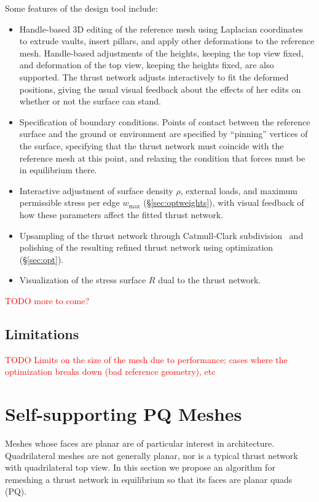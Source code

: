 \documentclass[annual]{acmsiggraph}
\newcommand{\todo}[1]{\textcolor{red}{#1}}
\newcommand{\secref}[1]{(\S\ref{#1})}
\begin{document}
Some features of the design tool include:
\begin{itemize}
\item Handle-based 3D editing of the reference mesh using Laplacian coordinates~\cite{Lipman2004,Sorkine2003} to extrude vaults, insert pillars, and apply other deformations to the reference mesh. Handle-based adjustments of the heights, keeping the top view fixed, and deformation of the top view, keeping the heights fixed, are also supported. The thrust network adjusts interactively to fit the deformed positions, giving the usual visual feedback about the effects of her edits on whether or not the surface can stand.
\item Specification of boundary conditions. Points of contact between the reference surface and the ground or environment are specified by ``pinning'' vertices of the surface, specifying that the thrust network must coincide with the reference mesh at this point, and relaxing the condition that forces must be in equilibrium there. 
\item Interactive adjustment of surface density $\rho$, external loads, and maximum permissible stress per edge $w_{\textrm{max}}$ \secref{sec:optweights}, with visual feedback of how these parameters affect the fitted thrust network.
\item Upsampling of the thrust network through Catmull-Clark subdivision~\cite{TODO} and polishing of the resulting refined thrust network using optimization \secref{sec:opt}.
\item Visualization of the stress surface $R$ dual to the thrust network.
\end{itemize}
\todo{TODO more to come?}
\subsection{Limitations}
\todo{TODO Limits on the size of the mesh due to performance; cases where the optimization breaks down (bad reference geometry), etc}

\section{Self-supporting PQ Meshes} \label{sec:pq}
Meshes whose faces are planar are of particular interest in architecture. Quadrilateral meshes are not generally planar, nor is a typical thrust network with quadrilateral top view. In this section we propose an algorithm for remeshing a thrust network in equilibrium so that its faces are planar quads (PQ).
\end{document}
